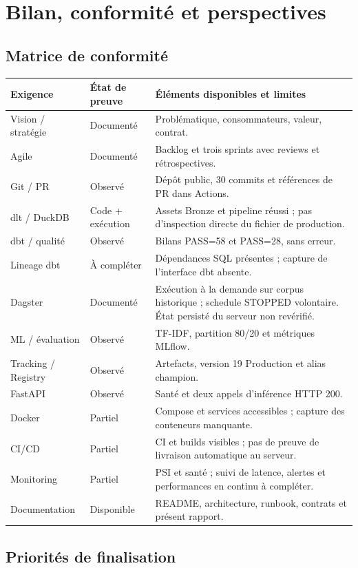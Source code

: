 \documentclass[11pt,a4paper]{report}
\begin{document}
\chapter{Bilan, conformité et perspectives}
\section{Matrice de conformité}
\begin{longtable}{p{3cm}p{3cm}p{8cm}}\toprule
\textbf{Exigence} & \textbf{État de preuve} & \textbf{Éléments disponibles et limites}\\\midrule\endhead
Vision / stratégie & Documenté & Problématique, consommateurs, valeur, contrat.\\
Agile & Documenté & Backlog et trois sprints avec reviews et rétrospectives.\\
Git / PR & Observé & Dépôt public, 30 commits et références de PR dans Actions.\\
dlt / DuckDB & Code + exécution & Assets Bronze et pipeline réussi ; pas d'inspection directe du fichier de production.\\
dbt / qualité & Observé & Bilans PASS=58 et PASS=28, sans erreur.\\
Lineage dbt & À compléter & Dépendances SQL présentes ; capture de l'interface dbt absente.\\
Dagster & Documenté & Exécution à la demande sur corpus historique ; schedule STOPPED volontaire. État persisté du serveur non revérifié.\\
ML / évaluation & Observé & TF-IDF, partition 80/20 et métriques MLflow.\\
Tracking / Registry & Observé & Artefacts, version 19 Production et alias champion.\\
FastAPI & Observé & Santé et deux appels d'inférence HTTP 200.\\
Docker & Partiel & Compose et services accessibles ; capture des conteneurs manquante.\\
CI/CD & Partiel & CI et builds visibles ; pas de preuve de livraison automatique au serveur.\\
Monitoring & Partiel & PSI et santé ; suivi de latence, alertes et performances en continu à compléter.\\
Documentation & Disponible & README, architecture, runbook, contrats et présent rapport.\\\bottomrule
\end{longtable}

\section{Priorités de finalisation}
\end{document}
